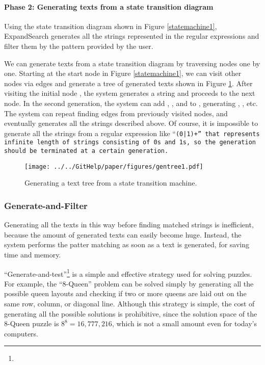 \documentclass[manuscript,anonymous,review]{acmart}
\def\ES{\textsf{ExpandSearch}}
\begin{document}
\paragraph{Phase 2: Generating texts from a state transition diagram}

Using the state transition diagram shown in Figure \ref{statemachine1},
{\ES} generates all the strings represented in the regular expressions
and filter them by the pattern provided by the user.

We can generate texts from a state transition diagram by traversing nodes one by one.
Starting at the start node
in Figure \ref{statemachine1},
we can visit other nodes via edges and generate a tree of generated texts
shown in Figure \ref{gentree1}.
After visiting the initial node
,
the system generates a string  and proceeds to the next node.
In the second generation,
the system can add , , and 
to , generating
, , etc.
The system can repeat finding edges from previously visited nodes,
and eventually generates all the strings described above.
Of course, it is impossible to generate all the strings
from a regular expression like ``\tt{(0|1)+}'' that represents infinite length of
strings consisting of \tt{0}s and \tt{1}s, so the generation should be
terminated at a certain generation.

\begin{figure}[htb]
\texttt{[image: ../../GitHelp/paper/figures/gentree1.pdf]}
\caption{Generating a text tree from a state transition machine.}
\label{gentree1}
\end{figure}

\subsubsection{Generate-and-Filter}

Generating all the texts in this way before finding matched strings is
inefficient, because the amount of generated texts can easily become huge.
Instead, the system performs the patter matching as soon as a text is generated,
for saving time and memory.

``Generate-and-test''\footnote{
}
is a simple and effective strategy used for solving puzzles.
For example,
the ``8-Queen'' problem can be solved simply by
generating all the possible queen layouts and checking if
two or more queens are laid out on the same row, column, or diagonal line.
Although this strategy is simple, the cost of
generating all the possible solutions is prohibitive, since
the solution space of the 8-Queen puzzle is $8^8 = 16,777,216$,
which is not a small amount even for today's computers.
\end{document}

